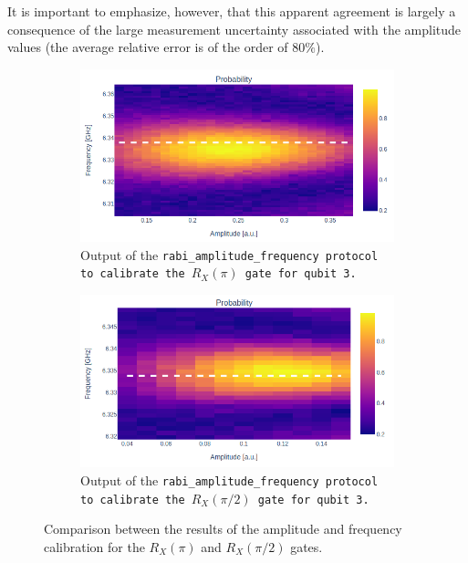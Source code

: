It is important to emphasize, however, that this apparent agreement is largely a consequence of the large measurement uncertainty associated with the amplitude values (the average relative error is of the order of $80\%$).

\begin{figure}[h!]
    \centering
    \begin{subfigure}[t]{0.45\textwidth}
        \includegraphics[width=\textwidth]{figures/png/RX90/RabiAmplitudeFrequency/RX.png}
        \caption{Output of the \tt{rabi\_amplitude\_frequency} protocol to calibrate the $R_X(\pi)$ gate for qubit \tt{3}.}
        \label{fig:RX_3}
    \end{subfigure}
    \hfill
    \begin{subfigure}[t]{0.45\textwidth}
        \includegraphics[width=\textwidth]{figures/png/RX90/RabiAmplitudeFrequency/RX90.png}
        \caption{Output of the \tt{rabi\_amplitude\_frequency} protocol to calibrate the $R_X(\pi/2)$ gate for qubit \tt{3}.}
        \label{fig:RX90_30}
    \end{subfigure}
    \caption{Comparison between the results of the amplitude and frequency calibration for the $R_X(\pi)$ and $R_X(\pi/2)$ gates.}
    \label{fig:af_qw5q}
\end{figure}

